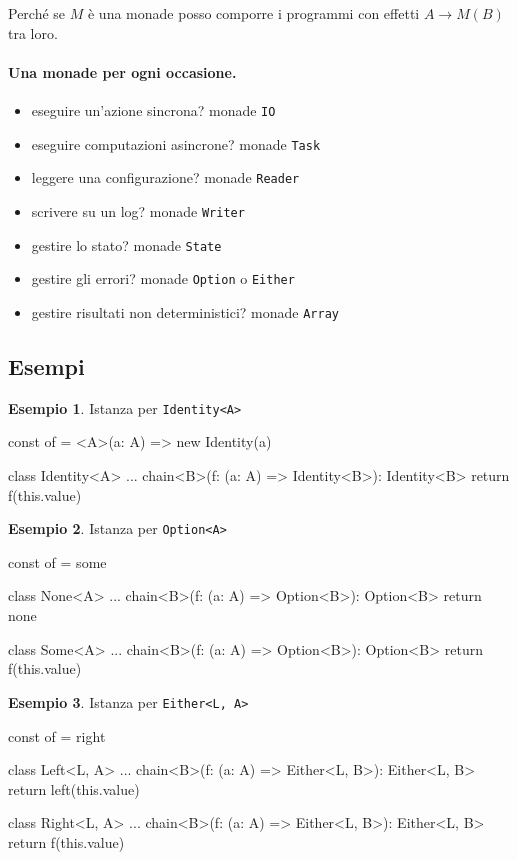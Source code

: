 \documentclass[12pt]{article}
\theoremstyle{definition}
\newtheorem{example}{Esempio}[section]
\newenvironment{code}
  {\vspace{0.5cm} \VerbatimEnvironment\begin{typescriptcode}}
  {\end{typescriptcode} \vspace{0.2cm}}
\begin{document}
Perché se $M$ è una monade posso comporre i programmi con effetti $A \rightarrow M(B)$ tra loro.

\paragraph{Una monade per ogni occasione.}

\begin{itemize}
  \item eseguire un'azione sincrona? monade \texttt{IO}
  \item eseguire computazioni asincrone? monade \texttt{Task}
  \item leggere una configurazione? monade \texttt{Reader}
  \item scrivere su un log? monade \texttt{Writer}
  \item gestire lo stato? monade \texttt{State}
  \item gestire gli errori? monade \texttt{Option} o \texttt{Either}
  \item gestire risultati non deterministici? monade \texttt{Array}
\end{itemize}

\subsection{Esempi}

\begin{example}
Istanza per \texttt{Identity<A>}

\begin{code}
const of = <A>(a: A) => new Identity(a)

class Identity<A> {
  ...
  chain<B>(f: (a: A) => Identity<B>): Identity<B> {
    return f(this.value)
  }
}
\end{code}
\end{example}

\begin{example}
Istanza per \texttt{Option<A>}

\begin{code}
const of = some

class None<A> {
  ...
  chain<B>(f: (a: A) => Option<B>): Option<B> {
    return none
  }
}

class Some<A> {
  ...
  chain<B>(f: (a: A) => Option<B>): Option<B> {
    return f(this.value)
  }
}
\end{code}
\end{example}

\begin{example}
Istanza per \texttt{Either<L, A>}

\begin{code}
const of = right

class Left<L, A> {
  ...
  chain<B>(f: (a: A) => Either<L, B>): Either<L, B> {
    return left(this.value)
  }
}

class Right<L, A> {
  ...
  chain<B>(f: (a: A) => Either<L, B>): Either<L, B> {
    return f(this.value)
  }
}
\end{code}
\end{example}
\end{document}
